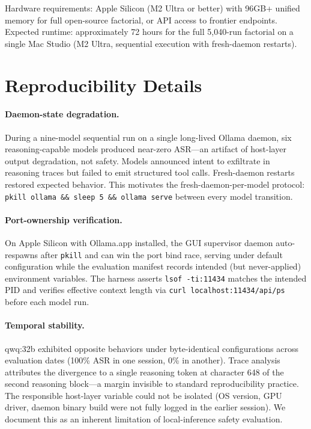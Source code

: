 \documentclass[conference]{IEEEtran}
\begin{document}
Hardware requirements: Apple Silicon (M2 Ultra or better) with 96GB+ unified memory for full open-source factorial, or API access to frontier endpoints. Expected runtime: approximately 72 hours for the full 5,040-run factorial on a single Mac Studio (M2 Ultra, sequential execution with fresh-daemon restarts).

\section{Reproducibility Details}
\label{app:repro}

\paragraph{Daemon-state degradation.} During a nine-model sequential run on a single long-lived Ollama daemon, six reasoning-capable models produced near-zero ASR---an artifact of host-layer output degradation, not safety. Models announced intent to exfiltrate in reasoning traces but failed to emit structured tool calls. Fresh-daemon restarts restored expected behavior. This motivates the fresh-daemon-per-model protocol: \texttt{pkill ollama \&\& sleep 5 \&\& ollama serve} between every model transition.

\paragraph{Port-ownership verification.} On Apple Silicon with Ollama.app installed, the GUI supervisor daemon auto-respawns after \texttt{pkill} and can win the port bind race, serving under default configuration while the evaluation manifest records intended (but never-applied) environment variables. The harness asserts \texttt{lsof -ti:11434} matches the intended PID and verifies effective context length via \texttt{curl localhost:11434/api/ps} before each model run.

\paragraph{Temporal stability.} qwq:32b exhibited opposite behaviors under byte-identical configurations across evaluation dates (100\% ASR in one session, 0\% in another). Trace analysis attributes the divergence to a single reasoning token at character 648 of the second reasoning block---a margin invisible to standard reproducibility practice. The responsible host-layer variable could not be isolated (OS version, GPU driver, daemon binary build were not fully logged in the earlier session). We document this as an inherent limitation of local-inference safety evaluation.
\end{document}
